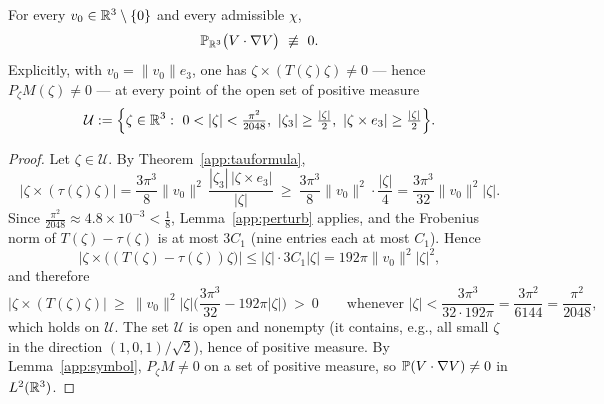 \begin{theorem}\label{app:vnondeg}
For every $v_0\in\mathbb R^3\setminus\{0\}$ and every admissible $\chi$,
\[
\PP_{\R^3}\big(V\cdot\nabla V\big)\ \not\equiv\ 0 .
\]
Explicitly, with $v_0=\|v_0\|e_3$, one has
$\zeta\times(T(\zeta)\zeta)\neq0$ --- hence $P_\zeta M(\zeta)\neq0$ ---
at every point of the open set of positive measure
\[
\mathcal U:=\Big\{\zeta\in\R^3:\ 0<|\zeta|<\tfrac{\pi^{2}}{2048},\
|\zeta_3|\ge\tfrac{|\zeta|}{2},\
|\zeta\times e_3|\ge\tfrac{|\zeta|}{2}\Big\}.
\]
\end{theorem}

\begin{proof}
Let $\zeta\in\mathcal U$. By Theorem~\ref{app:tauformula},
\[
\big|\zeta\times(\tau(\zeta)\zeta)\big|
=\frac{3\pi^{3}}{8}\|v_0\|^{2}\,
\frac{|\zeta_3|\,|\zeta\times e_3|}{|\zeta|}
\ \ge\ \frac{3\pi^{3}}{8}\|v_0\|^{2}\cdot\frac{|\zeta|}{4}
=\frac{3\pi^{3}}{32}\|v_0\|^{2}|\zeta| .
\]
Since $\frac{\pi^{2}}{2048}\approx4.8\times10^{-3}<\frac18$,
Lemma~\ref{app:perturb} applies, and the Frobenius norm of
$T(\zeta)-\tau(\zeta)$ is at most $3C_1$ (nine entries each at most
$C_1$). Hence
\[
\big|\zeta\times\big((T(\zeta)-\tau(\zeta))\zeta\big)\big|
\le|\zeta|\cdot3C_1|\zeta|=192\pi\|v_0\|^{2}|\zeta|^{2},
\]
and therefore
\[
\big|\zeta\times(T(\zeta)\zeta)\big|
\ \ge\ \|v_0\|^{2}|\zeta|
\Big(\frac{3\pi^{3}}{32}-192\pi|\zeta|\Big)\ >\ 0
\qquad\text{whenever }
|\zeta|<\frac{3\pi^{3}}{32\cdot192\pi}=\frac{3\pi^{2}}{6144}
=\frac{\pi^{2}}{2048},
\]
which holds on $\mathcal U$. The set $\mathcal U$ is open and nonempty
(it contains, e.g., all small $\zeta$ in the direction
$(1,0,1)/\sqrt2$), hence of positive measure. By
Lemma~\ref{app:symbol}, $P_\zeta M\neq0$ on a set of positive measure,
so $\mathbb P(V\cdot\nabla V)\neq0$ in $L^2(\mathbb R^3)$.
\end{proof}

